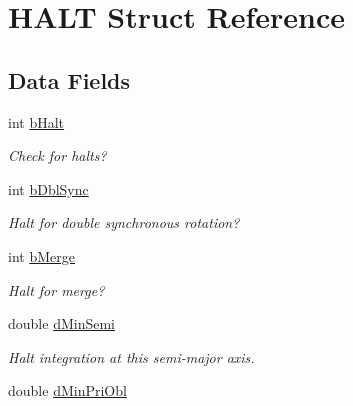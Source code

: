\hypertarget{struct_h_a_l_t}{}\section{H\+A\+L\+T Struct Reference}
\label{struct_h_a_l_t}
\subsection*{Data Fields}
\begin{DoxyCompactItemize}
\item 
\hypertarget{struct_h_a_l_t_a25846cb50bf661fdeb243ab28ac8bad0}{}int \hyperlink{struct_h_a_l_t_a25846cb50bf661fdeb243ab28ac8bad0}{b\+Halt}\label{struct_h_a_l_t_a25846cb50bf661fdeb243ab28ac8bad0}

\begin{DoxyCompactList}\small\item\em Check for halts? \end{DoxyCompactList}\item 
\hypertarget{struct_h_a_l_t_ae8accbf40184bb7f83a20f14563f2bf4}{}int \hyperlink{struct_h_a_l_t_ae8accbf40184bb7f83a20f14563f2bf4}{b\+Dbl\+Sync}\label{struct_h_a_l_t_ae8accbf40184bb7f83a20f14563f2bf4}

\begin{DoxyCompactList}\small\item\em Halt for double synchronous rotation? \end{DoxyCompactList}\item 
\hypertarget{struct_h_a_l_t_a605a9fbc5e77e42722c766415609f13c}{}int \hyperlink{struct_h_a_l_t_a605a9fbc5e77e42722c766415609f13c}{b\+Merge}\label{struct_h_a_l_t_a605a9fbc5e77e42722c766415609f13c}

\begin{DoxyCompactList}\small\item\em Halt for merge? \end{DoxyCompactList}\item 
\hypertarget{struct_h_a_l_t_a649e3fad47cb2ce06fc30a1f4862e58d}{}double \hyperlink{struct_h_a_l_t_a649e3fad47cb2ce06fc30a1f4862e58d}{d\+Min\+Semi}\label{struct_h_a_l_t_a649e3fad47cb2ce06fc30a1f4862e58d}

\begin{DoxyCompactList}\small\item\em Halt integration at this semi-\/major axis. \end{DoxyCompactList}\item 
\hypertarget{struct_h_a_l_t_a0f2ce2c181b7b366e461c0ab72083ae8}{}double \hyperlink{struct_h_a_l_t_a0f2ce2c181b7b366e461c0ab72083ae8}{d\+Min\+Pri\+Obl}\label{struct_h_a_l_t_a0f2ce2c181b7b366e461c0ab72083ae8}


\end{DoxyCompactItemize}
